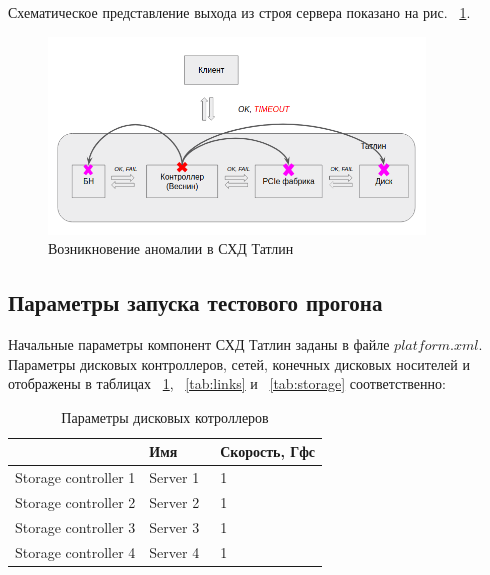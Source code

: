 Схематическое представление выхода из строя сервера показано на рис. ~\ref{fig:bad-tatlin}.

\begin{figure}[!ht]
\centering
\includegraphics[width=10cm]{Kenenbek/images/bad.png}
\caption{Возникновение аномалии в СХД Татлин}
\label{fig:bad-tatlin}
\end{figure}

\subsection{Параметры запуска тестового прогона}

Начальные параметры компонент СХД Татлин заданы в файле $platform.xml$. Параметры дисковых контроллеров, сетей, конечных дисковых носителей и отображены в таблицах ~\ref{tab:storage-contollers}, ~\ref{tab:links} и ~\ref{tab:storage} соответственно:

\begin{table}[]
\centering
\caption{Параметры дисковых котроллеров}
\label{tab:storage-contollers}
\begin{tabularx}{\textwidth}{|l|l|l|} 
\hline
                     & Имя       & Скорость, Гфс  \\ 
\hline
Storage controller 1 & Server 1~ & 1              \\ 
\hline
Storage controller 2 & Server 2~ & 1              \\ 
\hline
Storage controller 3 & Server 3~ & 1              \\ 
\hline
Storage controller 4 & Server 4~ & 1              \\
\hline
\end{tabularx}
\end{table}


